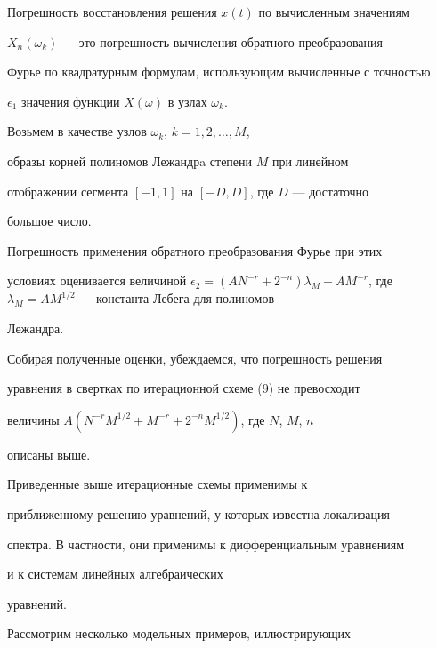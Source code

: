 Погрешность восстановления решения $ x(t) $ по вычисленным значениям


$ X_n(\omega_k) $ --- это погрешность вычисления обратного преобразования


Фурье по квадратурным формулам, использующим вычисленные с точностью


$\epsilon _1 $ значения функции $ X(\omega) $ в узлах $\omega_k$.





Возьмем в качестве узлов $\omega_k$, $k=1,2,\dotsc,M$,


образы корней полиномов Лежандрa степени $ M $ при линейном


отображении сегмента $ [-1,1] $ на $ [-D,D]$, где $ D $ --- достаточно


большое число.





Погрешность применения обратного преобразования Фурье при этих


условиях оценивается величиной $\epsilon_2=(AN^{-r}+2^{-n})\lambda_M+


AM^{-r}$, где $\lambda_M=AM^{1/2}$ --- константа Лебега для полиномов


Лежандра.





Собирая полученные оценки, убеждаемся, что погрешность решения


уравнения в свертках по итерационной схеме (9) не превосходит


величины $ A(N^{-r} M^{1/2}+M^{-r}+2^{-n} M^{1/2})$, где $ N$, $M$, $n $


описаны выше.





\begin{notenonum} Приведенные выше итерационные схемы применимы к


приближенному решению уравнений, у которых известна локализация


спектра. В частности, они применимы к дифференциальным уравнениям


и к системам линейных алгебраических


уравнений.


\end{notenonum}





Рассмотрим несколько модельных примеров, иллюстрирующих


